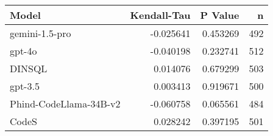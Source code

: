 \begin{tabular}{lrrr}
\toprule
Model & Kendall-Tau & P Value & n \\
\midrule
gemini-1.5-pro & -0.025641 & 0.453269 & 492 \\
gpt-4o & -0.040198 & 0.232741 & 512 \\
DINSQL & 0.014076 & 0.679299 & 503 \\
gpt-3.5 & 0.003413 & 0.919671 & 500 \\
Phind-CodeLlama-34B-v2 & -0.060758 & 0.065561 & 484 \\
CodeS & 0.028242 & 0.397195 & 501 \\
\bottomrule
\end{tabular}
